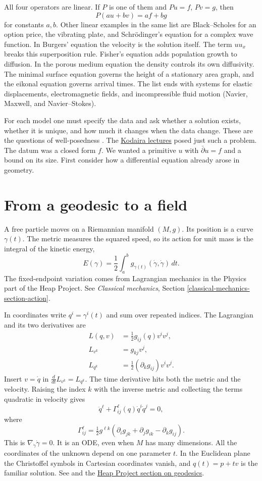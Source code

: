 All four operators are linear. If $P$ is
one of them and $Pu=f$, $Pv=g$, then
$$
P(au+bv)=af+bg
$$
for constants $a,b$. Other linear examples
in the same list are Black--Scholes for an
option price, the vibrating plate, and
Schr\"odinger's equation for a complex
wave function. In Burgers' equation the
velocity is the solution itself. The term
$uu_x$ breaks this superposition rule.
Fisher's equation adds population growth
to diffusion. In the porous medium equation
the density controls its own diffusivity.
The minimal surface equation governs the
height of a stationary area graph, and the
eikonal equation governs arrival times.
The list ends with systems for elastic
displacements, electromagnetic fields,
and incompressible fluid motion (Navier,
Maxwell, and Navier--Stokes).

For each model one must specify the data
and ask whether a solution exists, whether
it is unique, and how much it changes when
the data change. These are the questions
of well-posedness
\cite[Section 1.3]{salsa-verzini}.
The \href{https://www.heap-project.org/%
download/slides/kodaira-lectures/%
lecture-24.pdf}{Kodaira lectures} posed
just such a problem. The datum was a
closed form $f$.
We wanted a primitive $u$ with
$\bar\partial u=f$ and a bound on its
size. First consider how a differential
equation already arose in geometry.

\section{From a geodesic to a field}
\label{section-geodesic-field}

A free particle moves on a Riemannian
manifold $(M,g)$. Its position is a curve
$\gamma(t)$. The metric measures the
squared speed, so its action for unit mass
is the integral of the kinetic energy,
$$
E(\gamma)=\frac12\int_a^b
g_{\gamma(t)}(\dot\gamma,\dot\gamma)\,dt.
$$
The fixed-endpoint variation comes from
Lagrangian mechanics in the Physics part
of the Heap Project. See
\emph{Classical mechanics}, Section
\ref{classical-mechanics-section-action}.

In coordinates write $q^i=\gamma^i(t)$
and sum over repeated indices. The
Lagrangian and its two derivatives are
$$
\begin{aligned}
L(q,v)&=\tfrac12 g_{ij}(q)v^iv^j,\\
L_{v^k}&=g_{kj}v^j,\\
L_{q^k}&=\tfrac12(\partial_k g_{ij})v^iv^j.
\end{aligned}
$$
Insert $v=\dot q$ in
$\frac{d}{dt}L_{v^k}=L_{q^k}$. The time
derivative hits both the metric and the
velocity. Raising the index $k$ with the
inverse metric and collecting the terms
quadratic in velocity gives
$$
\ddot q^\ell+
\Gamma^\ell_{ij}(q)\dot q^i\dot q^j=0,
$$
where
$$
\Gamma^\ell_{ij}=\tfrac12 g^{\ell k}
(\partial_i g_{jk}+\partial_j g_{ik}
-\partial_k g_{ij}).
$$
This is $\nabla_{\dot\gamma}\dot\gamma=0$.
It is an ODE, even when $M$ has many
dimensions. All the coordinates of the
unknown depend on one parameter $t$.
In the Euclidean plane the Christoffel
symbols in Cartesian coordinates vanish,
and $q(t)=p+tv$ is the familiar solution.
See \cite[Section 19]{arn} and the
\href{https://www.heap-project.org/tag/05Q2}
{Heap Project section on geodesics}.

